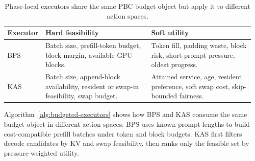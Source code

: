 \documentclass[lettersize,journal]{IEEEtran}
\begin{document}
\begin{table}[t]
\centering
\caption{Phase-local executors share the same PBC budget object but apply it to different action spaces.}
\label{tab:executor-interface}
\scriptsize
\begin{tabular}{@{}>{\raggedright\arraybackslash}p{}>{\raggedright\arraybackslash}p{}>{\raggedright\arraybackslash}p{}@{}}
\hline
\textbf{Executor} & \textbf{Hard feasibility} & \textbf{Soft utility}\\
\hline
BPS & Batch size, prefill-token budget, block margin, available GPU blocks. & Token fill, padding waste, block risk, short-prompt pressure, oldest progress.\\
KAS & Batch size, append-block availability, resident or swap-in feasibility, swap budget. & Attained service, age, resident preference, soft swap cost, skip-bounded fairness.\\
\hline
\end{tabular}
\end{table}

Algorithm~\ref{alg:budgeted-executors} shows how BPS and KAS consume the same budget object in different action spaces. BPS uses known prompt lengths to build cost-compatible prefill batches under token and block budgets. KAS first filters decode candidates by KV and swap feasibility, then ranks only the feasible set by pressure-weighted utility.
\end{document}
